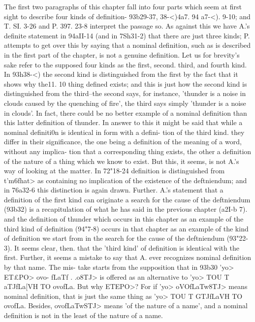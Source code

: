 {{{{{{{{{{{{{{{{{{{{{{{{{{{{{{{{{{{{The first two paragraphs of this chapter fall into four parts
which seem at first sight to describe four kinds of definition-
93b29-37, 38-<)4a7. 94 a7-<). 9-10; and T. SI. 3-26 and P. 397. 23-8
interpret the passage so. As against this we have A.'s definite
statement in 94aII-14 (and in 7Sh31-2) that there are just three
kinds; P. attempts to get over this by saying that a nominal
definition, such as is described in the first part of the chapter, is
not a genuine definition.
Let us for brevity's sake refer to the supposed four kinds as the
first, second. third, and fourth kind. In 93h38-<) the second kind
is distinguished from the first by the fact that it shows why the11.
10
thing defined exists; and this is just how the second kind is
distinguished from the third--the second says, for instance,
'thunder is a noise in clouds caused by the quenching of fire',
the third says simply 'thunder is a noise in clouds'. In fact,
there could be no better example of a nominal definition than this
latter definition of thunder. In answer to this it might be said
that while a nominal definiti0n is identical in form with a defini-
tion of the third kind. they differ in their significance, the one
being a definition of the meaning of a word, without any implica-
tion that a corresponding thing exists, the other a definition of
the nature of a thing which we know to exist. But this, it seems,
is not A.'s way of looking at the matter. In 72"18-24 definition is
distinguished from t'm6fhat> as containing no implication of the
existence of the deftniendum; and in 76a32-6 this distinction is
again drawn.
Further. A.'s statement that a definition of the first kind can
originate a search for the cause of the deftniendum (93b32) is a
recapitulation of what he has said in the previous chapter (a2I-b 7).
and the definition of thunder which occurs in this chapter as an
example of the third kind of definition (94"7-8) occurs in that
chapter as an example of the kind of definition we start from in
the search for the cause of the deftniendum (93"22-3).
It seems clear, then. that the 'third kind' of definition is
identical with the first. Further, it seems a mistake to say that
A. ever recognizes nominal definition by that name. The mis-
take starts from the supposition that in 93b30 '\6yo> ET£PO> ovo-
fLaTf . .o8TJ> is offered as an alternative to '\6yo> TOU T{ aTJfLa[VH TO
ovofLa. But why ETEPO>? For if '\6yo> oVOfLaTw8TJ> means nominal
definition, that is just the same thing as '\6yo> TOU T{ GTJfLa{VH TO
ovofLa. Besides, ovofLaTwSTJ> means 'of the nature of a name', and
a nominal definition is not in the least of the nature of a name.
}}}}}}}}}}}}}}}}}}}}}}}}}}}}}}}}}}}}}}}
